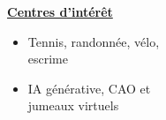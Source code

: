 \documentclass[letterpaper,10pt]{article}
\begin{document}
\begin{minipage}[t]{0.28\textwidth}
  \raggedright
  \textbf{\underline{Centres d'intérêt}}\\[-2pt]
  {\scriptsize
    \begin{itemize}[leftmargin=*,itemsep=1pt,parsep=0pt,topsep=0pt,partopsep=0pt]
      \item Tennis, randonnée, vélo, \\escrime
      \item IA générative, CAO et \\jumeaux virtuels
    \end{itemize}
  }
\end{minipage}



\end{document}
